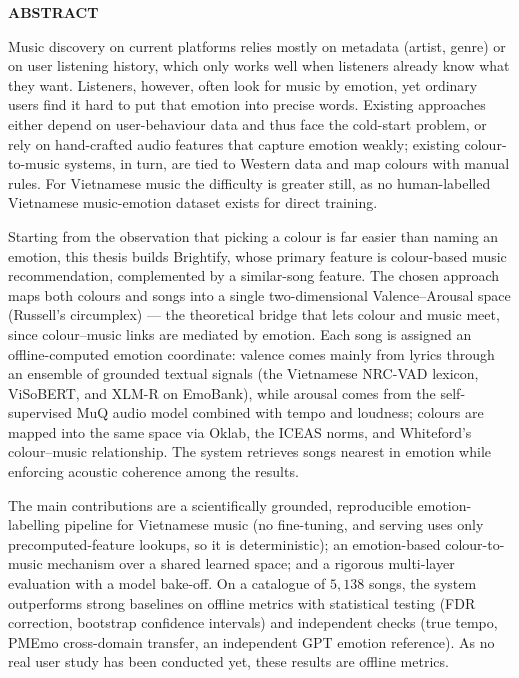 \documentclass[../DoAn.tex]{subfiles}
\begin{document}
\begin{center}
    \Large{\textbf{ABSTRACT}}\\
\end{center}
\vspace{1cm}

Music discovery on current platforms relies mostly on metadata (artist, genre) or on user listening history, which only works well when listeners already know what they want. Listeners, however, often look for music by emotion, yet ordinary users find it hard to put that emotion into precise words. Existing approaches either depend on user-behaviour data and thus face the cold-start problem, or rely on hand-crafted audio features that capture emotion weakly; existing colour-to-music systems, in turn, are tied to Western data and map colours with manual rules. For Vietnamese music the difficulty is greater still, as no human-labelled Vietnamese music-emotion dataset exists for direct training.

Starting from the observation that picking a colour is far easier than naming an emotion, this thesis builds Brightify, whose primary feature is colour-based music recommendation, complemented by a similar-song feature. The chosen approach maps both colours and songs into a single two-dimensional Valence--Arousal space (Russell's circumplex) --- the theoretical bridge that lets colour and music meet, since colour--music links are mediated by emotion. Each song is assigned an offline-computed emotion coordinate: valence comes mainly from lyrics through an ensemble of grounded textual signals (the Vietnamese NRC-VAD lexicon, ViSoBERT, and XLM-R on EmoBank), while arousal comes from the self-supervised MuQ audio model combined with tempo and loudness; colours are mapped into the same space via Oklab, the ICEAS norms, and Whiteford's colour--music relationship. The system retrieves songs nearest in emotion while enforcing acoustic coherence among the results.

The main contributions are a scientifically grounded, reproducible emotion-labelling pipeline for Vietnamese music (no fine-tuning, and serving uses only precomputed-feature lookups, so it is deterministic); an emotion-based colour-to-music mechanism over a shared learned space; and a rigorous multi-layer evaluation with a model bake-off. On a catalogue of $5{,}138$ songs, the system outperforms strong baselines on offline metrics with statistical testing (FDR correction, bootstrap confidence intervals) and independent checks (true tempo, PMEmo cross-domain transfer, an independent GPT emotion reference). As no real user study has been conducted yet, these results are offline metrics.
\end{document}
